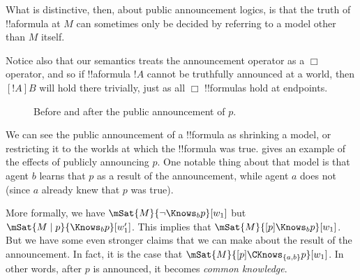\documentclass[../../../include/open-logic-section]{subfiles}
\begin{document}
What is distinctive, then, about public announcement logics, is that the truth of !!a{formula} at $M$
can sometimes only be decided by referring to a model other than $M$ itself.

Notice also that our semantics treats the announcement operator as a $\Box$ operator, and so
if !!a{formula} $!A$ cannot be truthfully announced at a world, then $[!A]B$ will hold there trivially,
just as all $\Box$ !!{formula}s hold at endpoints. 

\begin{figure}
  \begin{center}
  \end{center}
  \caption{Before and after the public announcement of $p$.}
\end{figure}

We can see the public announcement of a !!{formula} as shrinking a model, or restricting
it to the worlds at which the !!{formula} was true.  gives an
example of the effects of publicly announcing $p$. One notable thing about that model is that
agent $b$ learns that $p$ as a result of the announcement, while agent $a$ does not (since $a$
already knew that $p$ was true).

More formally, we have $\mSat{M}{\lnot \Knows_b p}[w_1]$ but $\mSat{M \mid p}{\Knows_b p}[w'_1]$. 
This implies that $\mSat{M}{[p] \Knows_b p}[w_1]$. But we have some even stronger claims that we 
can make about the result of the announcement. In fact, it is the case that $\mSat{M}{[p]\CKnows_{\{a,b\}} p}[w_1]$.
In other words, after $p$ is announced, it becomes \emph{common knowledge}.
\end{document}
